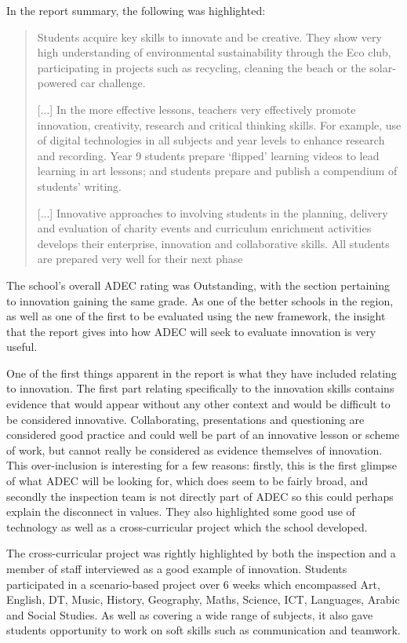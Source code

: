 \documentclass[11pt]{article}
\begin{document}
In the report summary, the following was highlighted:
\begin{quote}
	Students acquire key skills to innovate and be creative. They show very high understanding of environmental sustainability through the Eco club, participating in projects such as recycling, cleaning the beach or the solar-powered car challenge.
	
	[...] In the more effective lessons, teachers very effectively promote innovation, creativity, research and critical thinking skills. For example, use of digital technologies in all subjects and year levels to enhance research and recording. Year 9 students prepare `flipped' learning videos to lead learning in art lessons; and students prepare and publish a compendium of students' writing.
	
	[...] Innovative approaches to involving students in the planning, delivery and evaluation of charity events and curriculum enrichment activities develops their enterprise, innovation and collaborative skills. All students are prepared very well for their next phase
\end{quote}

The school's overall ADEC rating was Outstanding, with the section pertaining to innovation gaining the same grade. As one of the better schools in the region, as well as one of the first to be evaluated using the new framework, the insight that the report gives into how ADEC will seek to evaluate innovation is very useful.

One of the first things apparent in the report is what they have included relating to innovation. The first part relating specifically to the innovation skills contains evidence that would appear without any other context and would be difficult to be considered innovative. Collaborating, presentations and questioning are considered good practice and could well be part of an innovative lesson or scheme of work, but cannot really be considered as evidence themselves of innovation. This over-inclusion is interesting for a few reasons: firstly, this is the first glimpse of what ADEC will be looking for, which does seem to be fairly broad, and secondly the inspection team is not directly part of ADEC so this could perhaps explain the disconnect in values. They also highlighted some good use of technology as well as a cross-curricular project which the school developed.

The cross-curricular project was rightly highlighted by both the inspection and a member of staff interviewed as a good example of innovation. Students participated in a scenario-based project over 6 weeks which encompassed Art, English, DT, Music, History, Geography, Maths, Science, ICT, Languages, Arabic and Social Studies. As well as covering a wide range of subjects, it also gave students opportunity to work on soft skills such as communication and teamwork. 
\end{document}
